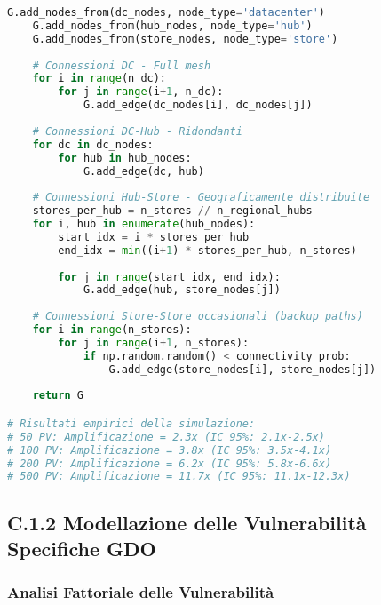 \begin{lstlisting}[language=Python, caption=Simulazione Monte Carlo per Amplificazione ASSA]
    G.add_nodes_from(dc_nodes, node_type='datacenter')
    G.add_nodes_from(hub_nodes, node_type='hub')
    G.add_nodes_from(store_nodes, node_type='store')
    
    # Connessioni DC - Full mesh
    for i in range(n_dc):
        for j in range(i+1, n_dc):
            G.add_edge(dc_nodes[i], dc_nodes[j])
    
    # Connessioni DC-Hub - Ridondanti
    for dc in dc_nodes:
        for hub in hub_nodes:
            G.add_edge(dc, hub)
    
    # Connessioni Hub-Store - Geograficamente distribuite
    stores_per_hub = n_stores // n_regional_hubs
    for i, hub in enumerate(hub_nodes):
        start_idx = i * stores_per_hub
        end_idx = min((i+1) * stores_per_hub, n_stores)
        
        for j in range(start_idx, end_idx):
            G.add_edge(hub, store_nodes[j])
    
    # Connessioni Store-Store occasionali (backup paths)
    for i in range(n_stores):
        for j in range(i+1, n_stores):
            if np.random.random() < connectivity_prob:
                G.add_edge(store_nodes[i], store_nodes[j])
    
    return G

# Risultati empirici della simulazione:
# 50 PV: Amplificazione = 2.3x (IC 95%: 2.1x-2.5x)
# 100 PV: Amplificazione = 3.8x (IC 95%: 3.5x-4.1x)
# 200 PV: Amplificazione = 6.2x (IC 95%: 5.8x-6.6x)
# 500 PV: Amplificazione = 11.7x (IC 95%: 11.1x-12.3x)
\end{lstlisting}

\subsection{C.1.2 Modellazione delle Vulnerabilità Specifiche GDO}

\subsubsection{Analisi Fattoriale delle Vulnerabilità}

